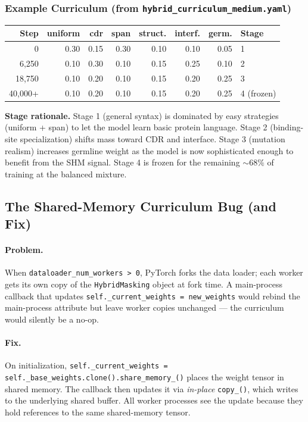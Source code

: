 \documentclass[11pt]{article}
\begin{document}
\subsubsection{Example Curriculum (from
\texttt{hybrid\_curriculum\_medium.yaml})}
\begin{center}
\small
\begin{tabular}{@{}r r r r r r r l@{}}
\toprule
Step & uniform & cdr & span & struct. & interf. & germ. & Stage \\
\midrule
0 & 0.30 & 0.15 & 0.30 & 0.10 & 0.10 & 0.05 & 1 \\
6{,}250 & 0.10 & 0.30 & 0.10 & 0.15 & 0.25 & 0.10 & 2 \\
18{,}750 & 0.10 & 0.20 & 0.10 & 0.15 & 0.20 & 0.25 & 3 \\
40{,}000+ & 0.10 & 0.20 & 0.10 & 0.15 & 0.20 & 0.25 & 4 (frozen) \\
\bottomrule
\end{tabular}
\end{center}
\vspace{0.5em}

\noindent \textbf{Stage rationale.} Stage 1 (general syntax) is
dominated by easy strategies (uniform + span) to let the model learn
basic protein language. Stage 2 (binding-site specialization) shifts
mass toward CDR and interface. Stage 3 (mutation realism) increases
germline weight as the model is now sophisticated enough to benefit
from the SHM signal. Stage 4 is frozen for the remaining $\sim 68\%$
of training at the balanced mixture.

\subsection{The Shared-Memory Curriculum Bug (and Fix)}
\paragraph{Problem.} When \texttt{dataloader\_num\_workers > 0},
PyTorch forks the data loader; each worker gets its own copy of the
\texttt{HybridMasking} object at fork time. A main-process callback
that updates \texttt{self.\_current\_weights = new\_weights} would
rebind the main-process attribute but leave worker copies unchanged
--- the curriculum would silently be a no-op.

\paragraph{Fix.} On initialization,
\texttt{self.\_current\_weights = self.\_base\_weights.clone().share\_memory\_()}
places the weight tensor in shared memory. The callback then updates
it via \emph{in-place} \texttt{copy\_()}, which writes to the underlying
shared buffer. All worker processes see the update because they hold
references to the same shared-memory tensor.
\end{document}
